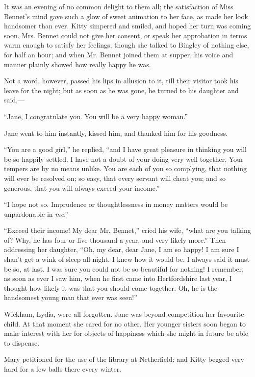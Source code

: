 It was an evening of no common delight to them all; the satisfaction of Miss Bennet's mind gave such a glow of sweet animation to her face, as made her look handsomer than ever. Kitty simpered and smiled, and hoped her turn was coming soon. Mrs. Bennet could not give her consent, or speak her approbation in terms warm enough to satisfy her feelings, though she talked to Bingley of nothing else, for half an hour; and when Mr. Bennet joined them at supper, his voice and manner plainly showed how really happy he was.

Not a word, however, passed his lips in allusion to it, till their visitor took his leave for the night; but as soon as he was gone, he turned to his daughter and said,---

``Jane, I congratulate you. You will be a very happy woman.''

Jane went to him instantly, kissed him, and thanked him for his goodness.

``You are a good girl,'' he replied, ``and I have great pleasure in thinking you will be so happily settled. I have not a doubt of your doing very well together. Your tempers are by no means unlike. You are each of you so complying, that nothing will ever be resolved on; so easy, that every servant will cheat you; and so generous, that you will always exceed your income.''

``I hope not so. Imprudence or thoughtlessness in money matters would be unpardonable in \textit{me}.''

``Exceed their income! My dear Mr. Bennet,'' cried his wife, ``what are you talking of? Why, he has four or five thousand a year, and very likely more.'' Then addressing her daughter, ``Oh, my dear, dear Jane, I am so happy! I am sure I shan't get a wink of sleep all night. I knew how it would be. I always said it must be so, at last. I was sure you could not be so beautiful for nothing! I remember, as soon as ever I saw him, when he first came into Hertfordshire last year, I thought how likely it was that you should come together. Oh, he is the handsomest young man that ever was seen!''

Wickham, Lydia, were all forgotten. Jane was beyond competition her favourite child. At that moment she cared for no other. Her younger sisters soon began to make interest with her for objects of happiness which she might in future be able to dispense.

Mary petitioned for the use of the library at Netherfield; and Kitty begged very hard for a few balls there every winter.

